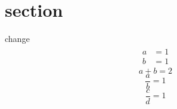 \documentclass{article}
\begin{document}
\section{section}
    change
    \begin{subequations} %
        \begin{gather}
            \begin{align}
                a &= 1\\
                b &= 1
            \end{align}
        \end{gather}
    \end{subequations}
    \begin{equation} %
        a + b= 2
    \end{equation}
    \begin{equation} %
        \frac{a}{b} = 1
    \end{equation}
    \begin{equation} %
        \frac{c}{d} = 1
    \end{equation}
\end{document}

